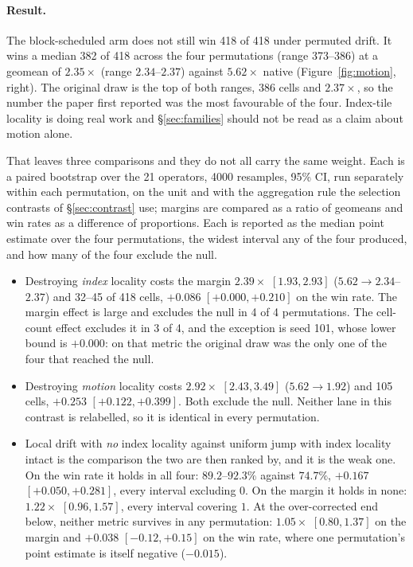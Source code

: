 \documentclass{article}
\begin{document}
\paragraph{Result.}
The block-scheduled arm does not still win 418 of 418 under permuted drift. It
wins a median 382 of 418 across the four permutations (range 373--386) at a
geomean of $2.35\times$ (range $2.34$--$2.37$) against $5.62\times$ native
(Figure~\ref{fig:motion}, right). The original draw is the top of both ranges,
386 cells and $2.37\times$, so the number the paper first reported was the most
favourable of the four. Index-tile locality is doing real work and
\S\ref{sec:families} should not be read as a claim about motion alone.

That leaves three comparisons and they do not all carry the same weight. Each is
a paired bootstrap over the 21 operators, 4000 resamples, 95\% CI, run
separately within each permutation, on the unit and with the aggregation rule
the selection contrasts of \S\ref{sec:contrast} use; margins are compared as a
ratio of geomeans and win rates as a difference of proportions. Each is reported
as the median point estimate over the four permutations, the widest interval any
of the four produced, and how many of the four exclude the null.

\begin{itemize}
\itemsep1pt
\item Destroying \emph{index} locality costs the margin $2.39\times$
$[1.93, 2.93]$ ($5.62 \to 2.34$--$2.37$) and 32--45 of 418 cells, $+0.086$
$[+0.000, +0.210]$ on the win rate. The margin effect is large and excludes the
null in 4 of 4 permutations. The cell-count effect excludes it in 3 of 4, and
the exception is seed 101, whose lower bound is $+0.000$: on that metric the
original draw was the only one of the four that reached the null.
\item Destroying \emph{motion} locality costs $2.92\times$ $[2.43, 3.49]$
($5.62 \to 1.92$) and 105 cells, $+0.253$ $[+0.122, +0.399]$. Both exclude the
null. Neither lane in this contrast is relabelled, so it is identical in every
permutation.
\item Local drift with \emph{no} index locality against uniform jump with index
locality intact is the comparison the two are then ranked by, and it is the weak
one. On the win rate it holds in all four: $89.2$--$92.3\%$ against $74.7\%$,
$+0.167$ $[+0.050, +0.281]$, every interval excluding $0$. On the margin it
holds in none: $1.22\times$ $[0.96, 1.57]$, every interval covering $1$. At the
over-corrected end below, neither metric survives in any permutation:
$1.05\times$ $[0.80, 1.37]$ on the margin and $+0.038$ $[-0.12, +0.15]$ on the
win rate, where one permutation's point estimate is itself negative
($-0.015$).
\end{itemize}
\end{document}
